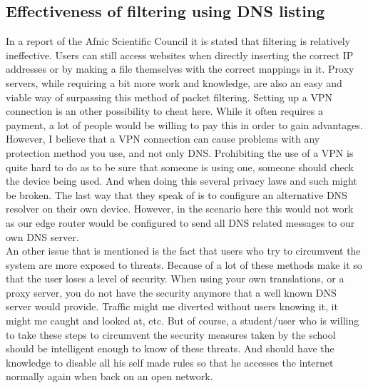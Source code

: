 \subsection{Effectiveness of filtering using DNS listing}
In a report of the Afnic Scientific Council \textcite{COUNCIL} it is stated that filtering is relatively ineffective. Users can still access websites when directly inserting the correct IP addresses or by making a file themselves with the correct mappings in it. Proxy servers, while requiring a bit more work and knowledge, are also an easy and viable way of surpassing this method of packet filtering. Setting up a VPN connection is an other possibility to cheat here. While it often requires a payment, a lot of people would be willing to pay this in order to gain advantages. However, I believe that a VPN connection can cause problems with any protection method you use, and not only DNS. Prohibiting the use of a VPN is quite hard to do as to be sure that someone is using one, someone should check the device being used. And when doing this several privacy laws and such might be broken. The last way that they speak of is to configure an alternative DNS resolver on their own device. However, in the scenario here this would not work as our edge router would be configured to send all DNS related messages to our own DNS server.\\
An other issue that is mentioned is the fact that users who try to circumvent the system are more exposed to threats. Because of a lot of these methods make it so that the user loses a level of security. When using your own translations, or a proxy server, you do not have the security anymore that a well known DNS server would provide. Traffic might me diverted without users knowing it, it might me caught and looked at, etc. But of course, a student/user who is willing to take these steps to circumvent the security measures taken by the school should be intelligent enough to know of these threats. And should have the knowledge to disable all his self made rules so that he accesses the internet normally again when back on an open network. 
